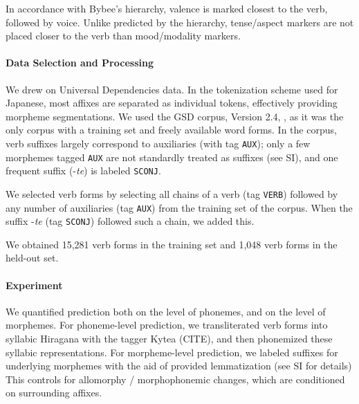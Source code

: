 In accordance with Bybee's hierarchy, valence is marked closest to the verb, followed by voice.
Unlike predicted by the hierarchy, tense/aspect markers are not placed closer to the verb than mood/modality markers.



\paragraph{Data Selection and Processing}
We drew on Universal Dependencies data.
In the tokenization scheme used for Japanese, most affixes are separated as individual tokens, effectively providing morpheme segmentations.
We used the GSD corpus, Version 2.4, \citep{tanaka2016universal, asahara2018universal}, as it was the only corpus with a training set and freely available word forms.
In the corpus, verb suffixes largely correspond to auxiliaries (with tag \texttt{AUX}); only a few morphemes tagged \texttt{AUX} are not standardly treated as suffixes (see SI), and one frequent suffix (-\textit{te}) is labeled \texttt{SCONJ}.

We selected verb forms by selecting all chains of a verb (tag \texttt{VERB}) followed by any number of auxiliaries (tag \texttt{AUX}) from the training set of the corpus. When the suffix -\textit{te} (tag \texttt{SCONJ}) followed such a chain, we added this.

We obtained 15,281 verb forms in the training set and 1,048 verb forms in the held-out set.





\paragraph{Experiment}
We quantified prediction both on the level of phonemes, and on the level of morphemes.
For phoneme-level prediction, we transliterated verb forms into syllabic Hiragana with the tagger Kytea (CITE), and then phonemized these syllabic representations.
For morpheme-level prediction, we labeled suffixes for underlying morphemes with the aid of provided lemmatization (see SI for details)
This controls for allomorphy / morphophonemic changes, which are conditioned on surrounding affixes.


